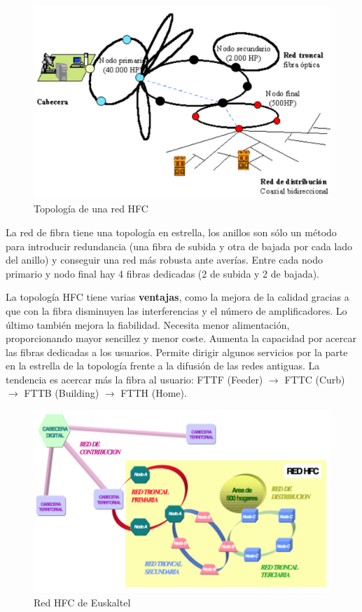 \documentclass[10pt,portrait, twocolumn]{article}
\begin{document}
	\begin{figure}[!ht]
 		\centering
  		 \includegraphics[scale = 0.35]{images/TopologiaHFC}
		\caption{Topología de una red HFC}
	\end{figure}	

La red de fibra tiene una topología en estrella, los anillos son sólo un método para introducir redundancia (una fibra de subida y otra de bajada por cada lado del anillo) y conseguir una red más robusta ante averías. Entre cada nodo primario y nodo final hay 4 fibras dedicadas (2 de subida y 2 de bajada).

La topología HFC tiene varias \textbf{ventajas}, como la mejora de la calidad gracias a que con la fibra disminuyen las interferencias y el número de amplificadores. Lo último también mejora la fiabilidad. Necesita menor alimentación, proporcionando mayor sencillez y menor coste. Aumenta la capacidad por acercar las fibras dedicadas a los usuarios. Permite dirigir algunos servicios por la parte en la estrella de la topología frente a la difusión de las redes antiguas. La tendencia es acercar más la fibra al usuario: FTTF (Feeder) $\rightarrow$ FTTC (Curb) $\rightarrow$ FTTB (Building) $\rightarrow$ FTTH (Home).\\

	\begin{figure}[!ht]
 		\centering
  		 \includegraphics[scale = 0.4]{images/Euskaltel}
		\caption{Red HFC de Euskaltel}
	\end{figure}	
\end{document}
